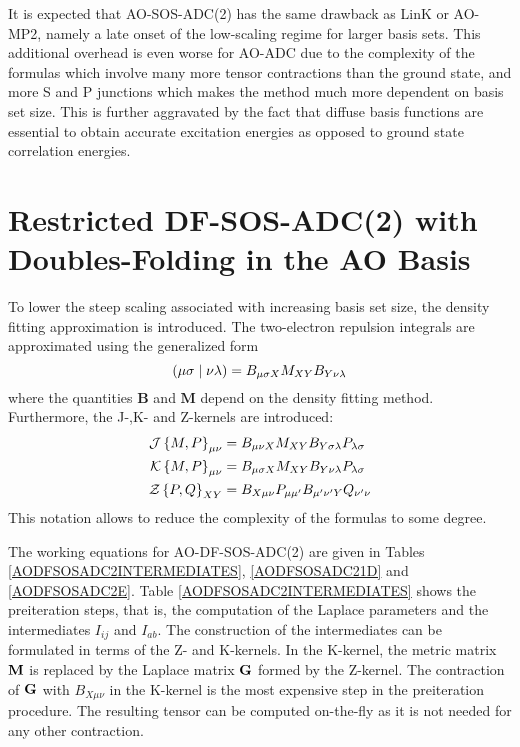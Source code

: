It is expected that AO-SOS-ADC(2) has the same drawback as LinK or AO-MP2, namely a late onset of the low-scaling regime for larger basis sets. This additional overhead is even worse for AO-ADC due to the complexity of the formulas which involve many more tensor contractions than the ground state, and more S and P junctions which makes the method much more dependent on basis set size. This is further aggravated by the fact that diffuse basis functions are essential to obtain accurate excitation energies as opposed to ground state correlation energies.

\section{Restricted DF-SOS-ADC(2) with Doubles-Folding in the AO Basis}

To lower the steep scaling associated with increasing basis set size, the density fitting approximation is introduced. The two-electron repulsion integrals are approximated using the generalized form
\begin{equation}
\left( \mu\sigma \mid \nu\lambda \right) = B_{\mu\sigma X} M_{XY} B_{Y \nu\lambda}
\end{equation}
\noindent where the quantities $\mathbf{B}$ and $\mathbf{M}$ depend on the density fitting method. Furthermore, the J-,K- and Z-kernels are introduced:
\begin{align}
\mathcal{J}\left\lbrace M,P \right\rbrace_{\mu\nu} &= B_{\mu\nu X} M_{XY} B_{Y\sigma\lambda} P_{\lambda\sigma} \\
\mathcal{K}\left\lbrace M,P \right\rbrace_{\mu\nu} &= B_{\mu\sigma X} M_{XY} B_{Y \nu\lambda} P_{\lambda\sigma} \\
\mathcal{Z}\left\lbrace P,Q \right\rbrace_{XY} &= B_{X\mu\nu} P_{\mu\mu'} B_{\mu'\nu' Y} Q_{\nu' \nu} 
\end{align}
\noindent This notation allows to reduce the complexity of the formulas to some degree. 

The working equations for AO-DF-SOS-ADC(2) are given in Tables \ref{AODFSOSADC2INTERMEDIATES}, \ref{AODFSOSADC21D} and \ref{AODFSOSADC2E}. Table \ref{AODFSOSADC2INTERMEDIATES} shows the preiteration steps, that is, the computation of the Laplace parameters and the intermediates $I_{ij}$ and $I_{ab}$. The construction of the intermediates can be formulated in terms of the Z- and K-kernels. In the K-kernel, the metric matrix $\mathbf{M}$ is replaced by the Laplace matrix $\mathbf{G}$ formed by the Z-kernel. The contraction of $\mathbf{G}$ with $B_{X\mu\nu}$ in the K-kernel is the most expensive step in the preiteration procedure. The resulting tensor can be computed on-the-fly as it is not needed for any other contraction.

